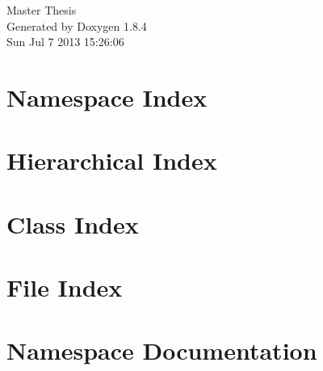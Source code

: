\documentclass[twoside]{book}
\newcommand{\clearemptydoublepage}{%
  \newpage{\pagestyle{empty}\cleardoublepage}%
}
\begin{document}
\hypersetup{pageanchor=false}
\begin{titlepage}
\vspace*{7cm}
\begin{center}%
{\Large Master Thesis }\\
\vspace*{1cm}
{\large Generated by Doxygen 1.8.4}\\
\vspace*{0.5cm}
{\small Sun Jul 7 2013 15:26:06}\\
\end{center}
\end{titlepage}
\clearemptydoublepage
\tableofcontents
\clearemptydoublepage
{}
\hypersetup{pageanchor=true}

\chapter{Namespace Index}

\chapter{Hierarchical Index}

\chapter{Class Index}

\chapter{File Index}

\chapter{Namespace Documentation}

\end{document}
